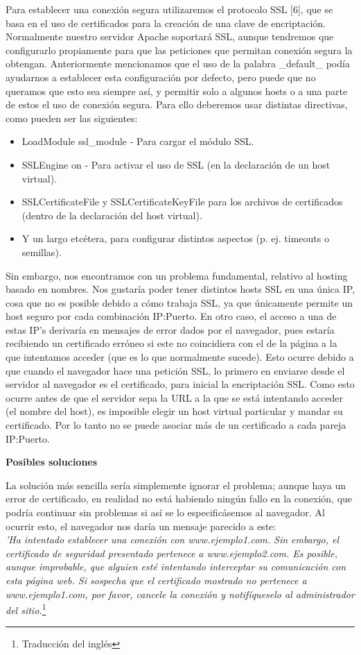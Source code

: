 \documentclass[a4paper, 10pt]{article} %
\begin{document}
Para establecer una conexión segura utilizaremos el protocolo SSL [6], que se basa en el uso de certificados para la creación de una clave de encriptación. Normalmente nuestro servidor Apache soportará SSL, aunque tendremos que configurarlo propiamente para que las peticiones que permitan conexión segura la obtengan. Anteriormente mencionamos que el uso de la palabra \_default\_ podía ayudarnos a establecer esta configuración por defecto, pero puede que no queramos que esto sea siempre así, y permitir solo a algunos hosts o a una parte de estos el uso de conexión segura. Para ello deberemos usar distintas directivas, como pueden ser las siguientes:

\begin{itemize}
\item LoadModule ssl\_module - Para cargar el módulo SSL. 
\item SSLEngine on - Para activar el uso de SSL (en la declaración de un host virtual). 
\item SSLCertificateFile y SSLCertificateKeyFile para los archivos de certificados (dentro de la declaración del host virtual).
\item Y un largo etcétera, para configurar distintos aspectos (p. ej. timeouts o semillas).
\end{itemize}

Sin embargo, nos encontramos con un problema fundamental, relativo al hosting basado en nombres. Nos gustaría poder tener distintos hosts SSL en una única IP, cosa que no es posible debido a cómo trabaja SSL, ya que únicamente permite un host seguro por cada combinación IP:Puerto. En otro caso, el acceso a una de estas IP's derivaría en mensajes de error dados por el navegador, pues estaría recibiendo un certificado erróneo si este no coincidiera con el de la página a la que intentamos acceder (que es lo que normalmente sucede). Esto ocurre debido a que cuando el navegador hace una petición SSL, lo primero en enviarse desde el servidor al navegador es el certificado, para inicial la encriptación SSL. Como esto ocurre antes de que el servidor sepa la URL a la que se está intentando acceder (el nombre del host), es imposible elegir un host virtual particular y mandar su certificado. Por lo tanto no se puede asociar más de un certificado a cada pareja IP:Puerto. 

\textbf{Posibles soluciones}

La solución más sencilla sería simplemente ignorar el problema; aunque haya un error de certificado, en realidad no está habiendo ningún fallo en la conexión, que podría continuar sin problemas si así se lo especificásemos al navegador. Al ocurrir esto, el navegador nos daría un mensaje parecido a este: \\
\textit{'Ha intentado establecer una conexión con www.ejemplo1.com. Sin embargo, el certificado de seguridad presentado pertenece a www.ejemplo2.com. Es posible, aunque improbable, que alguien esté intentando interceptar su comunicación con esta página web. Si sospecha que el certificado mostrado no pertenece a www.ejemplo1.com, por favor, cancele la conexión y notifíqueselo al administrador del sitio.}\footnote{Traducción del inglés} 
\end{document}
